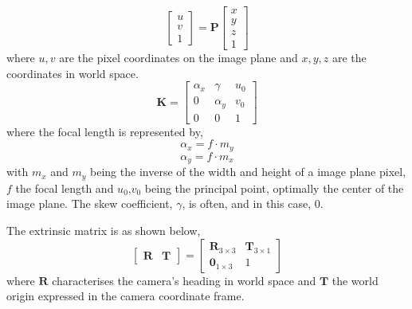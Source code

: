         \begin{equation} \label{eq:full_projection}
            \begin{bmatrix}
                u \\
                v \\
                1
            \end{bmatrix}
            = \bm{P}
            \begin{bmatrix}
                x \\
                y \\
                z \\
                1
            \end{bmatrix}
        \end{equation}
        where \(u,v\) are the pixel coordinates on the image plane and \(x,y,z\) are the coordinates in world space.
        \begin{equation} \label{eq:intrinsic}
            \bm{K} =
            \begin{bmatrix}
                \alpha_x & \gamma   & u_0 \\
                0        & \alpha_y & v_0 \\
                0        & 0        & 1
            \end{bmatrix}
        \end{equation}
        where the focal length is represented by,
        \[\alpha_x = f \cdot m_y\]
        \[\alpha_y = f \cdot m_x\]
        with \(m_x\) and \(m_y\) being the inverse of the width and height of a image plane pixel, \(f\) the focal length and \(u_0\),\(v_0\) being the principal point, optimally the center of the image plane.
        The skew coefficient, \(\gamma\), is often, and in this case, 0.

        The extrinsic matrix is as shown below,
        \begin{equation}\label{eq:extrinsic}
            \begin{bmatrix}
                \bm{R} & \bm{T}
            \end{bmatrix}
            =
            \begin{bmatrix}
                \bm{R}_{3\times3} & \bm{T}_{3\times1} \\
                \bm{0}_{1\times3} & 1
            \end{bmatrix}
        \end{equation}
        where \(\bm{R}\) characterises the camera's heading in world space and \(\bm{T}\) the world origin expressed in 
        the camera coordinate frame.

